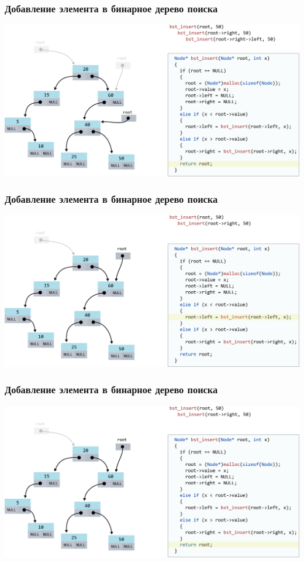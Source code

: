 \documentclass[10pt,pdf,hyperref={unicode}]{beamer}
\begin{document}
\begin{frame}[fragile]
\frametitle{Добавление элемента в бинарное дерево поиска}
\begin{center}
\includegraphics[width=\imageSizeMult\linewidth]{../images/codetree/codetree18.png}
\end{center}
\end{frame}

\begin{frame}[fragile]
\frametitle{Добавление элемента в бинарное дерево поиска}
\begin{center}
\includegraphics[width=\imageSizeMult\linewidth]{../images/codetree/codetree19.png}
\end{center}
\end{frame}

\begin{frame}[fragile]
\frametitle{Добавление элемента в бинарное дерево поиска}
\begin{center}
\includegraphics[width=\imageSizeMult\linewidth]{../images/codetree/codetree20.png}
\end{center}
\end{frame}
\end{document}

